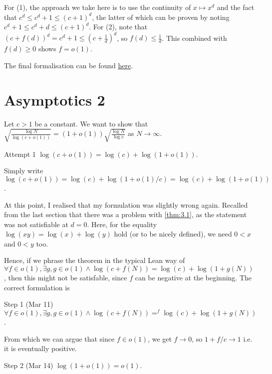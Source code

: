 \documentclass{article}[11px]
\begin{document}
For (1), the approach we take here is to use the continuity of \(x \mapsto x^d\) and the fact that \(c^d \leq c^d + 1 \leq (c + 1)^d\), the latter of which can be proven by noting \(c^d + 1 \leq c^d + d \leq (c + 1)^d\). For (2), note that \((c + f(d))^d = c^d + 1 \leq \left(c + \frac{1}{d}\right)^d\), so \(f(d) \leq \frac{1}{d}\). This combined with \(f(d) \geq 0\) shows \(f = o(1)\).

The final formalisation can be found \href{https://gist.github.com/grhkm21/cc839b7d3c0f0d29a1b8c84e4ba8347b}{here}.

\pagebreak

\section{Asymptotics 2}\label{sec:asymptotics2}

Let \(c > 1\) be a constant. We want to show that \(\sqrt{\frac{\log N}{\log(c + o(1))}} = (1 + o(1))\sqrt{\frac{\log N}{\log c}}\) as \(N \to \infty\).

\begin{theorem}{Attempt 1}{}
  \(\log(c + o(1)) = \log(c) + \log(1 + o(1))\).
\end{theorem}

Simply write \(\log(c + o(1)) = \log(c) + \log(1 + o(1) / c) = \log(c) + \log(1 + o(1))\).

At this point, I realised that my formulation was slightly wrong again. Recalled from the last section that there was a problem with \ref{thm:3.1}, as the statement was not satisfiable at \(d = 0\). Here, for the equality \(\log(xy) = \log(x) + \log(y)\) hold (or to be nicely defined), we need \(0 < x\) and \(0 < y\) too.

Hence, if we phrase the theorem in the typical Lean way of \(\forall f \in o(1), \exists g, g \in o(1) \land \log(c + f(N)) = \log(c) + \log(1 + g(N))\), then this might not be satisfable, since \(f\) can be negative at the beginning. The correct formulation is

\begin{theorem}{\ok Step 1 (Mar 11)}{}
  \(\forall f \in o(1), \exists g, g \in o(1) \land \log(c + f(N)) =^f \log(c) + \log(1 + g(N))\).
\end{theorem}

From which we can argue that since \(f \in o(1)\), we get \(f \to 0\), so \(1 + f / c \to 1\) i.e. it is eventually positive.

\begin{theorem}{\ok Step 2 (Mar 14)}{}
  \(\log(1 + o(1)) = o(1)\).
\end{theorem}
\end{document}
